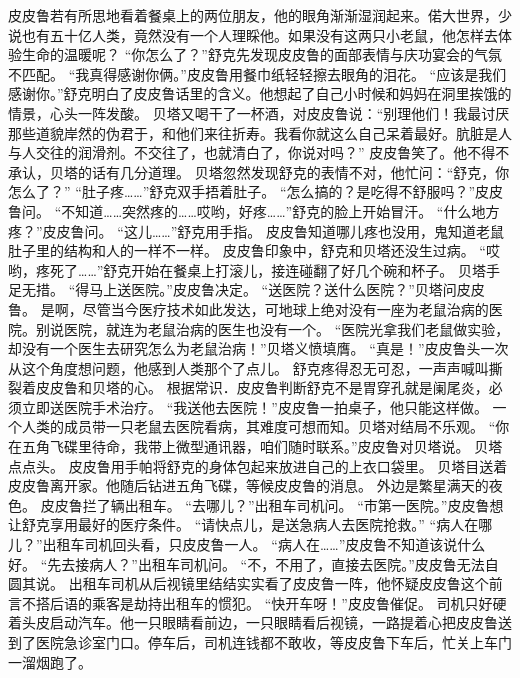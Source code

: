 \documentclass[a4paper,12pt,UTF8,twoside]{ctexbook}
\begin{document}
        皮皮鲁若有所思地看着餐桌上的两位朋友，他的眼角渐渐湿润起来。偌大世界，少说也有五十亿人类，竟然没有一个人理睬他。如果没有这两只小老鼠，他怎样去体验生命的温暖呢？ 
        “你怎么了？”舒克先发现皮皮鲁的面部表情与庆功宴会的气氛不匹配。 
        “我真得感谢你俩。”皮皮鲁用餐巾纸轻轻擦去眼角的泪花。 
        “应该是我们感谢你。”舒克明白了皮皮鲁话里的含义。他想起了自己小时候和妈妈在洞里挨饿的情景，心头一阵发酸。 
        贝塔又喝干了一杯酒，对皮皮鲁说：“别理他们！我最讨厌那些道貌岸然的伪君于，和他们来往折寿。我看你就这么自己呆着最好。肮脏是人与人交往的润滑剂。不交往了，也就清白了，你说对吗？” 
        皮皮鲁笑了。他不得不承认，贝塔的话有几分道理。 
        贝塔忽然发现舒克的表情不对，他忙问：“舒克，你怎么了？” 
        “肚子疼……”舒克双手捂着肚子。 
       “怎么搞的？是吃得不舒服吗？”皮皮鲁问。 
        “不知道……突然疼的……哎哟，好疼……”舒克的脸上开始冒汗。 
        “什么地方疼？”皮皮鲁问。 
        “这儿……”舒克用手指。 
        皮皮鲁知道哪儿疼也没用，鬼知道老鼠肚子里的结构和人的一样不一样。 
        皮皮鲁印象中，舒克和贝塔还没生过病。 
        “哎哟，疼死了……”舒克开始在餐桌上打滚儿，接连碰翻了好几个碗和杯子。 
        贝塔手足无措。 
        “得马上送医院。”皮皮鲁决定。 
        “送医院？送什么医院？”贝塔问皮皮鲁。 
        是啊，尽管当今医疗技术如此发达，可地球上绝对没有一座为老鼠治病的医院。别说医院，就连为老鼠治病的医生也没有一个。 
        “医院光拿我们老鼠做实验，却没有一个医生去研究怎么为老鼠治病！”贝塔义愤填膺。 
        “真是！”皮皮鲁头一次从这个角度想问题，他感到人类那个了点儿。 
        舒克疼得忍无可忍，一声声喊叫撕裂着皮皮鲁和贝塔的心。 
        根据常识．皮皮鲁判断舒克不是胃穿孔就是阑尾炎，必须立即送医院手术治疗。 
        “我送他去医院！”皮皮鲁一拍桌子，他只能这样做。 
        一个人类的成员带一只老鼠去医院看病，其难度可想而知。贝塔对结局不乐观。 
        “你在五角飞碟里待命，我带上微型通讯器，咱们随时联系。”皮皮鲁对贝塔说。 
        贝塔点点头。 
        皮皮鲁用手帕将舒克的身体包起来放进自己的上衣口袋里。 
        贝塔目送着皮皮鲁离开家。他随后钻进五角飞碟，等候皮皮鲁的消息。 
        外边是繁星满天的夜色。 
        皮皮鲁拦了辆出租车。 
        “去哪儿？”出租车司机问。 
        “市第一医院。”皮皮鲁想让舒克享用最好的医疗条件。  “请快点儿，是送急病人去医院抢救。” 
        “病人在哪儿？”出租车司机回头看，只皮皮鲁一人。 
        “病人在……”皮皮鲁不知道该说什么好。 
        “先去接病人？”出租车司机问。 
        “不，不用了，直接去医院。”皮皮鲁无法自圆其说。 
        出租车司机从后视镜里结结实实看了皮皮鲁一阵，他怀疑皮皮鲁这个前言不搭后语的乘客是劫持出租车的惯犯。 
        “快开车呀！”皮皮鲁催促。 
        司机只好硬着头皮启动汽车。他一只眼睛看前边，一只眼睛看后视镜，一路提着心把皮皮鲁送到了医院急诊室门口。停车后，司机连钱都不敢收，等皮皮鲁下车后，忙关上车门一溜烟跑了。 
\end{document}
